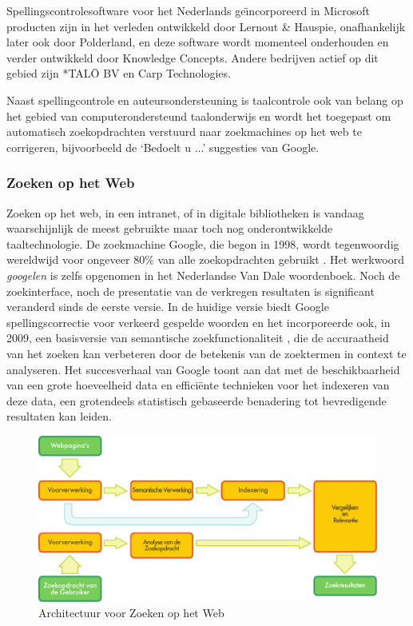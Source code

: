 \documentclass[]{../../metanetpaper}
\begin{document}
\begin{multicols}{2}
    Spellingscontrolesoftware voor het Nederlands ge{\"\i}ncorporeerd in Microsoft producten zijn in het verleden ontwikkeld door Lernout \& Hauspie, onafhankelijk later ook door Polderland, en deze software wordt momenteel onderhouden en verder ontwikkeld door Knowledge Concepts. Andere bedrijven actief op dit gebied zijn *TAL{\=O} BV en Carp Technologies.

    Naast spellingcontrole en auteursondersteuning is taalcontrole ook van belang op het gebied van computerondersteund taalonderwijs en wordt het toegepast om automatisch zoekopdrachten verstuurd naar zoekmachines op het web te corrigeren, bijvoorbeeld de `Bedoelt u ...' suggesties van Google.

\subsubsection{Zoeken op het Web}

 Zoeken op het web, in een intranet, of in digitale bibliotheken is vandaag waarschijnlijk de meest gebruikte maar toch nog onderontwikkelde taaltechnologie. De zoekmachine Google, die begon in 1998, wordt tegenwoordig wereldwijd voor ongeveer 80\% van alle zoekopdrachten gebruikt \cite{Spiegel}. Het werkwoord \emph{googelen} is zelfs opgenomen in het Nederlandse Van Dale woordenboek. Noch de zoekinterface, noch de presentatie van de verkregen resultaten is significant veranderd sinds de eerste versie. In de huidige versie biedt Google spellingscorrectie voor verkeerd gespelde woorden en het incorporeerde ook, in 2009, een basisversie van semantische zoekfunctionaliteit \cite{GoogleSem}, die de accuraatheid van het zoeken kan verbeteren door de betekenis van de zoektermen in context te analyseren. Het succesverhaal van Google toont aan dat met de beschikbaarheid van een grote hoeveelheid data en effici{\"e}nte technieken voor het indexeren van deze data, een grotendeels statistisch gebaseerde benadering tot bevredigende resultaten kan leiden.

\begin{figure}[tb]
  \center
  \includegraphics[width=\textwidth]{../_media/dutch/web_search_architecture}
  \vspace{-5mm}
  \caption{Architectuur voor Zoeken op het Web}
  \label{fig:websearcharch_de}
\end{figure}


\end{multicols}
\end{document}
